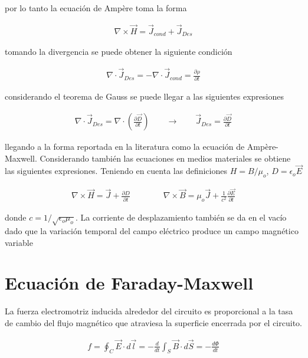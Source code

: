\noindent por lo tanto la ecuación de Ampère toma la forma

\begin{eqnarray}
    \nabla \times \vec{H} = \vec{J}_{cond} + \vec{J}_{Des}
\end{eqnarray}

\noindent tomando la divergencia se puede obtener la siguiente condición 

\begin{eqnarray}
    \nabla \cdot \vec{J}_{Des} = -\nabla \cdot \vec{J}_{cond} = \frac{\partial \rho}{\partial t}
\end{eqnarray}

\noindent considerando el teorema de Gauss \cite{Arfken} se puede llegar a las siguientes expresiones

\begin{eqnarray}
    \nabla\cdot\vec{J}_{Des} =  \nabla\cdot\left(\frac{\partial\vec{D}}{\partial t}\right) \qquad \longrightarrow \qquad \vec{J}_{Des} = \frac{\partial \vec{D}}{\partial t}
\end{eqnarray}


\noindent llegando a la forma reportada en la literatura como la ecuación de Ampère-Maxwell. Considerando también las ecuaciones en medios materiales se obtiene las siguientes expresiones. Teniendo en cuenta las definiciones $H = B/\mu_{o}$, $D = \epsilon_{o}\vec{E}$ 

\begin{eqnarray}
\label{Ampere}
    \boxed{\nabla \times \vec{H} = \vec{J} + \frac{\partial D}{\partial t}} \qquad \qquad \boxed{\nabla \times \vec{B} = \mu_{o}\vec{J} + \frac{1}{c^{2}}\frac{\partial \vec{E}}{\partial t}}
\end{eqnarray}

\noindent donde $c =1/\sqrt{\epsilon_{o}\mu_{o}}$. La corriente de desplazamiento también se da en el vacío dado que la variación temporal del campo eléctrico produce un campo magnético variable 

\section{Ecuación de Faraday-Maxwell}

\noindent La fuerza electromotriz inducida alrededor del circuito es proporcional a la tasa de cambio del flujo magnético que atraviesa la superficie encerrada por el circuito.  \cite{Lacava}

\begin{eqnarray}
\label{Faraday}
    f = \oint_{C} \vec{E}\cdot d\vec{l} = -\frac{d }{dt}\int_{S}\vec{B}\cdot d\vec{S} = -\frac{ d\Phi}{dt}
\end{eqnarray}

